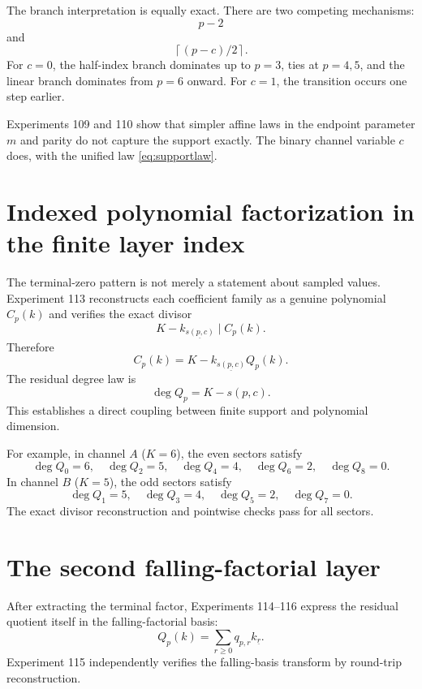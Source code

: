 \documentclass[11pt,a4paper]{article}
\newcommand{\fall}[2]{#1_{\underline{#2}}}
\newcommand{\ceil}[1]{\left\lceil #1 \right\rceil}
\begin{document}
The branch interpretation is equally exact.  There are two competing mechanisms:
\[
p-2
\]
and
\[
\ceil{(p-c)/2}.
\]
For $c=0$, the half-index branch dominates up to $p=3$, ties at $p=4,5$, and the linear branch dominates from $p=6$ onward.  For $c=1$, the transition occurs one step earlier.

Experiments 109 and 110 show that simpler affine laws in the endpoint parameter $m$ and parity do not capture the support exactly.  The binary channel variable $c$ does, with the unified law \eqref{eq:supportlaw}.

\section{Indexed polynomial factorization in the finite layer index}

The terminal-zero pattern is not merely a statement about sampled values.  Experiment 113 reconstructs each coefficient family as a genuine polynomial $C_p(k)$ and verifies the exact divisor
\begin{equation}
\label{eq:indexfactor}
\fall{K-k}{s(p,c)}\mid C_p(k).
\end{equation}
Therefore
\begin{equation}
\label{eq:indexquotient}
C_p(k)=\fall{K-k}{s(p,c)}Q_p(k).
\end{equation}
The residual degree law is
\begin{equation}
\label{eq:degreecoupling}
\deg Q_p=K-s(p,c).
\end{equation}
This establishes a direct coupling between finite support and polynomial dimension.

For example, in channel $A$ ($K=6$), the even sectors satisfy
\[
\deg Q_{0}=6,\quad
\deg Q_{2}=5,\quad
\deg Q_{4}=4,\quad
\deg Q_{6}=2,\quad
\deg Q_{8}=0.
\]
In channel $B$ ($K=5$), the odd sectors satisfy
\[
\deg Q_{1}=5,\quad
\deg Q_{3}=4,\quad
\deg Q_{5}=2,\quad
\deg Q_{7}=0.
\]
The exact divisor reconstruction and pointwise checks pass for all sectors.

\section{The second falling-factorial layer}

After extracting the terminal factor, Experiments 114--116 express the residual quotient itself in the falling-factorial basis:
\begin{equation}
\label{eq:qfall}
Q_p(k)=\sum_{r\ge0}q_{p,r}\fall{k}{r}.
\end{equation}
Experiment 115 independently verifies the falling-basis transform by round-trip reconstruction.
\end{document}
